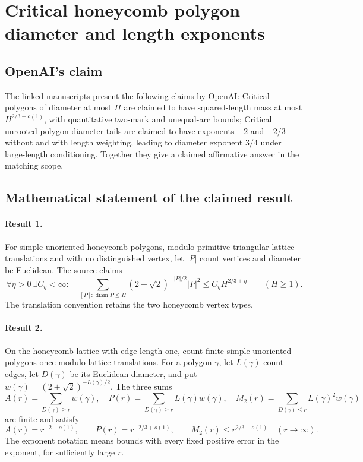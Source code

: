 \documentclass[11pt]{article}
\begin{document}
\section*{Critical honeycomb polygon diameter and length exponents}

\subsection{OpenAI's claim}
The linked manuscripts present the following claims by OpenAI: Critical polygons of diameter at most $H$ are claimed to have squared-length mass at most $H^{2/3+o(1)}$, with quantitative two-mark and unequal-arc bounds; Critical unrooted polygon diameter tails are claimed to have exponents $-2$ and $-2/3$ without and with length weighting, leading to diameter exponent $3/4$ under large-length conditioning. Together they give a claimed affirmative answer in the matching scope.

\subsection{Mathematical statement of the claimed result}
\paragraph{Result 1.} For simple unoriented honeycomb polygons, modulo primitive triangular-lattice translations and with no distinguished vertex, let \(|P|\) count vertices and diameter be Euclidean. The source claims
\[
 \forall\eta>0\ \exists C_\eta<\infty:\quad
 \sum_{[P]:\operatorname{diam}P\le H}(2+\sqrt2)^{-|P|/2}|P|^2
 \le C_\eta H^{2/3+\eta}\qquad(H\ge1).
\]
The translation convention retains the two honeycomb vertex types.

\paragraph{Result 2.} On the honeycomb lattice with edge length one, count finite simple unoriented polygons once modulo lattice translations. For a polygon $\gamma$, let $L(\gamma)$ count edges, let $D(\gamma)$ be its Euclidean diameter, and put $w(\gamma)=(2+\sqrt2)^{-L(\gamma)/2}$. The three sums
\[
 A(r)=\sum_{D(\gamma)\ge r}w(\gamma),\quad
 P(r)=\sum_{D(\gamma)\ge r}L(\gamma)w(\gamma),\quad
 M_2(r)=\sum_{D(\gamma)\le r}L(\gamma)^2w(\gamma)
\]
are finite and satisfy
\[
 A(r)=r^{-2+o(1)},\qquad P(r)=r^{-2/3+o(1)},\qquad M_2(r)\le r^{2/3+o(1)}\quad(r\to\infty).
\]
The exponent notation means bounds with every fixed positive error in the exponent, for sufficiently large $r$.
\end{document}
